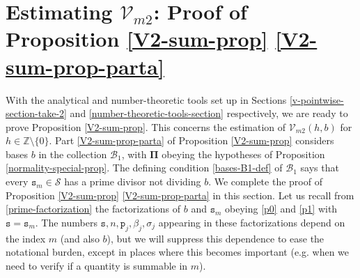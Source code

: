 \documentclass[12pt, twoside]{article}
\def\red{\color{red}}
\theoremstyle{definition}
\numberwithin{equation}{section}
\begin{document}
\section{Estimating $\mathcal V_{m2}$: Proof of Proposition \ref{V2-sum-prop} \eqref{V2-sum-prop-parta}} \label{estimating-vm-section-Part1}
With the analytical and number-theoretic tools set up in Sections \ref{v-pointwise-section-take-2} and \ref{number-theoretic-tools-section} respectively, we are ready to prove Proposition \ref{V2-sum-prop}. This concerns the estimation of $\mathcal V_{m2}(h, b)$ for $h \in \mathbb Z \setminus \{0\}$. Part \eqref{V2-sum-prop-parta} of Proposition \ref{V2-sum-prop} considers bases $b$ in the collection $\mathscr{B}_1$, with $\pmb{\Pi}$ obeying the hypotheses of Proposition \ref{normality-special-prop}. The defining condition \eqref{bases-B1-def} of $\mathscr{B}_1$ says that every $\mathtt s_m \in \mathcal S$ has a prime divisor not dividing $b$. We complete the proof of  Proposition \ref{V2-sum-prop} \eqref{V2-sum-prop-parta} in this section.  
\vskip0.1in 
\noindent Let us recall from \eqref{prime-factorization} the factorizations of $b$ and $\mathtt s_m$ obeying \eqref{p0} and \eqref{p1} with $\mathtt s = \mathtt s_m$. 
The numbers $\mathtt s, n, \mathtt p_j, \beta_j, \sigma_j$ appearing in these factorizations depend on the index $m$ (and also $b$), but we will suppress this dependence to ease the notational burden, except in places where this becomes important (e.g. when we need to verify if a quantity is summable in $m$).  

\vskip0.1in 
\end{document}
